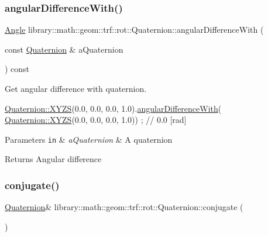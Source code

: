 \subsubsection{\texorpdfstring{angular\+Difference\+With()}{angularDifferenceWith()}}
{\footnotesize\ttfamily \hyperlink{classlibrary_1_1math_1_1geom_1_1_angle}{Angle} library\+::math\+::geom\+::trf\+::rot\+::\+Quaternion\+::angular\+Difference\+With (\begin{DoxyParamCaption}\item[{const \hyperlink{classlibrary_1_1math_1_1geom_1_1trf_1_1rot_1_1_quaternion}{Quaternion} \&}]{a\+Quaternion }\end{DoxyParamCaption}) const}



Get angular difference with quaternion. 


\begin{DoxyCode}
\hyperlink{classlibrary_1_1math_1_1geom_1_1trf_1_1rot_1_1_quaternion_ad6426210c54c79fc5296b5375380a7ca}{Quaternion::XYZS}(0.0, 0.0, 0.0, 1.0).\hyperlink{classlibrary_1_1math_1_1geom_1_1trf_1_1rot_1_1_quaternion_a82c585870a5c5833ae8869c8e193d94a}{angularDifferenceWith}(
      \hyperlink{classlibrary_1_1math_1_1geom_1_1trf_1_1rot_1_1_quaternion_ad6426210c54c79fc5296b5375380a7ca}{Quaternion::XYZS}(0.0, 0.0, 0.0, 1.0)) ; \textcolor{comment}{// 0.0 [rad]}
\end{DoxyCode}



\begin{DoxyParams}[1]{Parameters}
\mbox{\tt in}  & {\em a\+Quaternion} & A quaternion \\
\hline
\end{DoxyParams}
\begin{DoxyReturn}{Returns}
Angular difference 
\end{DoxyReturn}
\mbox{\label{classlibrary_1_1math_1_1geom_1_1trf_1_1rot_1_1_quaternion_ab14a6520e55eae7fcb6c2ee144fe8d21}} 
\subsubsection{\texorpdfstring{conjugate()}{conjugate()}}
{\footnotesize\ttfamily \hyperlink{classlibrary_1_1math_1_1geom_1_1trf_1_1rot_1_1_quaternion}{Quaternion}\& library\+::math\+::geom\+::trf\+::rot\+::\+Quaternion\+::conjugate (\begin{DoxyParamCaption}{ }\end{DoxyParamCaption})}



